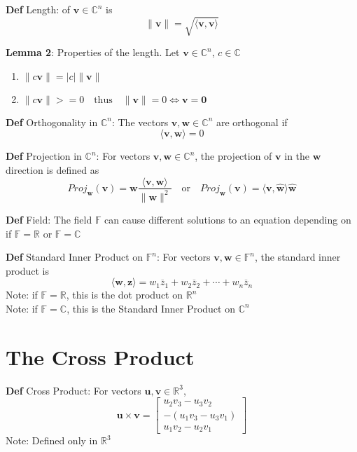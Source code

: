 \documentclass[11pt,notitlepage]{report}
\newcommand{\bb}[1]{\ensuremath{\mathbb{#1}}}
\newcommand{\tbf}[1]{\textbf{#1}}
\begin{document}
\textbf{Def} Length: of $\tbf v \in \mathbb C^n$ is 
$$\lVert \tbf v \rVert = \sqrt{\langle \textbf{v}, \textbf{v}\rangle}$$


\textbf{Lemma 2}: Properties of the length. Let $\tbf v \in \mathbb C^n$, $c \in \mathbb C$
\begin{enumerate}[label=(\roman*)]
    \item $\lVert c\tbf v \rVert = |c| \lVert \tbf v \rVert$
    \item $\lVert c\tbf v \rVert >= 0 \quad \text{thus} \quad \lVert \tbf v \rVert = 0 \Longleftrightarrow \tbf v = \tbf 0$
\end{enumerate}


\textbf{Def} Orthogonality in $\mathbb C^n$: The vectors $\tbf v, \tbf w \in \mathbb C^n$ are orthogonal if 
$$\langle \tbf v,\tbf w\rangle = 0$$


\textbf{Def} Projection in $\mathbb C^n$: For vectors $\tbf v, \tbf w \in \mathbb C^n$, the projection of $\tbf v$ in the $\tbf w$ direction is defined as
$$Proj_\tbf w(\tbf v) = \tbf w\frac{\langle \tbf v,\tbf w\rangle}{\lVert \tbf w \rVert^2} \quad \text{or} \quad Proj_\tbf w(\tbf v) = \langle \tbf v,\hat{\tbf w}\rangle \hat{\tbf w}$$


\textbf{Def} Field: The field $\mathbb F$ can cause different solutions to an equation depending on if $\mathbb F = \mathbb R$ or $\mathbb F = \mathbb C$


\textbf{Def} Standard Inner Product on $\mathbb F^n$: For vectors $\tbf v, \tbf w \in \mathbb F^n$, the standard inner product is 
$$\langle \tbf w,\tbf z\rangle = w_1\overline{z}_1 + w_2\overline{z}_2 + \cdots + w_n\overline{z}_n$$
\hspace*{5mm}Note: if $\mathbb F = \mathbb R$, this is the dot product on $\mathbb R^n$\\
\hspace*{5mm}Note: if $\mathbb F = \mathbb C$, this is the Standard Inner Product on $\mathbb C^n$




\section{The Cross Product}


\textbf{Def} Cross Product: For vectors $\tbf u, \tbf v \in \mathbb R^3$,
$$\tbf u \times \tbf v = \begin{bmatrix}
u_2v_3-u_3v_2\\
-(u_1v_3-u_3v_1)\\
u_1v_2-u_2v_1
\end{bmatrix}$$
\hspace*{5mm} Note: Defined  only in $\bb R^3$
\end{document}
